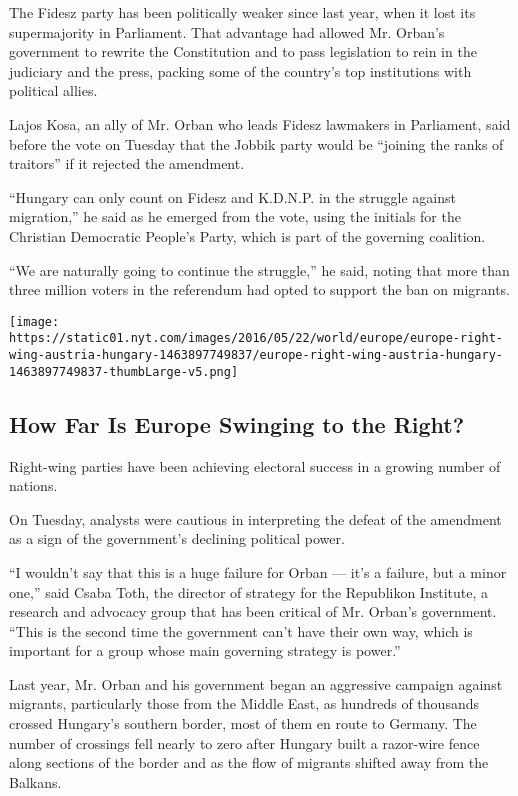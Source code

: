 The Fidesz party has been politically weaker since last year, when it
lost its supermajority in Parliament. That advantage had allowed Mr.
Orban's government to rewrite the Constitution and to pass legislation
to rein in the judiciary and the press, packing some of the country's
top institutions with political allies.

Lajos Kosa, an ally of Mr. Orban who leads Fidesz lawmakers in
Parliament, said before the vote on Tuesday that the Jobbik party would
be ``joining the ranks of traitors'' if it rejected the amendment.

``Hungary can only count on Fidesz and K.D.N.P. in the struggle against
migration,'' he said as he emerged from the vote, using the initials for
the Christian Democratic People's Party, which is part of the governing
coalition.

``We are naturally going to continue the struggle,'' he said, noting
that more than three million voters in the referendum had opted to
support the ban on migrants.

\href{https://www.nytimes.com/interactive/2016/05/22/world/europe/europe-right-wing-austria-hungary.html}{}

\texttt{[image: https://static01.nyt.com/images/2016/05/22/world/europe/europe-right-wing-austria-hungary-1463897749837/europe-right-wing-austria-hungary-1463897749837-thumbLarge-v5.png]}

\hypertarget{how-far-is-europe-swinging-to-the-right}{%
\subsection{How Far Is Europe Swinging to the
Right?}\label{how-far-is-europe-swinging-to-the-right}}

Right-wing parties have been achieving electoral success in a growing
number of nations.

On Tuesday, analysts were cautious in interpreting the defeat of the
amendment as a sign of the government's declining political power.

``I wouldn't say that this is a huge failure for Orban --- it's a
failure, but a minor one,'' said Csaba Toth, the director of strategy
for the Republikon Institute, a research and advocacy group that has
been critical of Mr. Orban's government. ``This is the second time the
government can't have their own way, which is important for a group
whose main governing strategy is power.''

Last year, Mr. Orban and his government began an aggressive campaign
against migrants, particularly those from the Middle East, as hundreds
of thousands crossed Hungary's southern border, most of them en route to
Germany. The number of crossings fell nearly to zero after Hungary built
a razor-wire fence along sections of the border and as the flow of
migrants shifted away from the Balkans.

